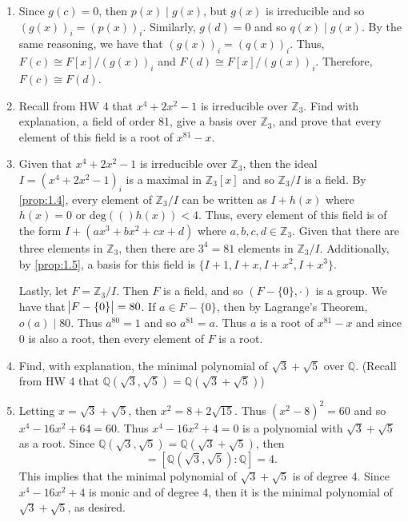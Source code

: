 \documentclass{article}
\makeatletter
\newcommand{\deg}[1]{\text{deg}(#1)}
\theoremstyle{definition}
\theoremstyle{remark}
\let\oldproofname=\proofname
\renewcommand{\proofname}{\textit{\oldproofname}}
\theoremstyle{definition}
\renewenvironment{proof}[1][\proofname]{\par
  \pushQED{\qed}%
  \normalfont \topsep6\p@\@plus6\p@\relax
  \list{}{\leftmargin=0mm
          \rightmargin=0mm
          \settowidth{\itemindent}{\itshape#1}%
          \labelwidth=\itemindent
          \parsep=0pt \listparindent=0mm%
  }
  \item[\hskip\labelsep
        \itshape
    #1\@addpunct{.}]\ignorespaces
}{%
  \popQED\endlist\@endpefalse
}
\makeatother
\begin{document}
\begin{enumerate}[leftmargin=*]
\begin{proof}
            Since $g(c)=0$, then $p(x)\mid g(x)$, but $g(x)$ is irreducible and so $(g(x))_i=(p(x))_i$. Similarly, $g(d)=0$ and so $q(x)\mid g(x)$. By the same reasoning, we have that $(g(x))_i=(q(x))_i$. Thus, $F(c)\cong F[x]/(g(x))_i$ and $F(d)\cong F[x]/(g(x))_i$. Therefore, $F(c)\cong F(d)$.
        \end{proof}
    \item Recall from HW 4 that $x^4+2x^2-1$ is irreducible over $\mathbb{Z}_3$. Find with explanation, a field of order 81, give a basis over $\mathbb{Z}_3$, and prove that every element of this field is a root of $x^{81}-x$.
        \begin{proof}
            Given that $x^4+2x^2-1$ is irreducible over $\mathbb{Z}_3$, then the ideal $I=(x^4+2x^2-1)_i$ is a maximal in $\mathbb{Z}_3[x]$ and so $\mathbb{Z}_3/I$ is a field. By \cref{prop:1.4}, every element of $\mathbb{Z}_3/I$ can be written as $I+h(x)$ where $h(x)=0$ or $\deg(h(x))<4$. Thus, every element of this field is of the form $I+(ax^3+bx^2+cx+d)$ where $a,b,c,d\in\mathbb{Z}_3$. Given that there are three elements in $\mathbb{Z}_3$, then there are $3^4=81$ elements in $\mathbb{Z}_3/I$. Additionally, by \cref{prop:1.5}, a basis for this field is $\{I+1,I+x,I+x^2,I+x^3\}$.\par\hspace{4mm} Lastly, let $F=\mathbb{Z}_3/I$. Then $F$ is a field, and so $(F-\{0\},\cdot)$ is a group. We have that  $\abs{F-\{0\}}=80$. If $a\in F-\{0\}$, then by Lagrange's Theorem, $o(a)\mid 80$. Thus $a^{80}=1$ and so $a^{81}=a$. Thus $a$ is a root of $x^{81}-x$ and since 0 is also a root, then every element of $F$ is a root.
        \end{proof}
    \item Find, with explanation, the minimal polynomial of $\sqrt{3}+\sqrt{5}$ over $\mathbb{Q}$. (Recall from HW 4 that $\mathbb{Q}(\sqrt{3},\sqrt{5})=\mathbb{Q}(\sqrt{3}+\sqrt{5})$)
        \begin{proof}
            Letting $x=\sqrt{3}+\sqrt{5}$, then $x^2=8+2\sqrt{15}$. Thus $(x^2-8)^2=60$ and so $x^4-16x^2+64=60$. Thus $x^4-16x^2+4=0$ is a polynomial with $\sqrt{3}+\sqrt{5}$ as a root. Since $\mathbb{Q}(\sqrt{3},\sqrt{5})=\mathbb{Q}(\sqrt{3}+\sqrt{5})$, then 
                \begin{equation*}
                    [\mathbb{Q}(\sqrt{3}+\sqrt{5}\colon\mathbb{Q}]=[\mathbb{Q}(\sqrt{3},\sqrt{5})\colon\mathbb{Q}]=4.
                \end{equation*}
            This implies that the minimal polynomial of $\sqrt{3}+\sqrt{5}$ is of degree 4. Since $x^4-16x^2+4$ is monic and of degree 4, then it is the minimal polynomial of $\sqrt{3}+\sqrt{5}$, as desired.

\end{proof}
\end{enumerate}
\end{document}
